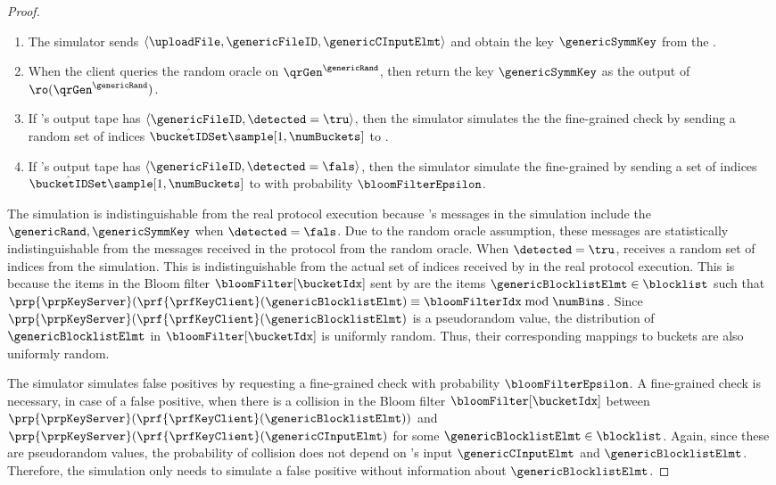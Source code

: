 \begin{proof}
\begin{enumerate}
\item  The simulator sends $\langle \uploadFile, \genericFileID, \genericCInputElmt \rangle$ and obtain the key
$\genericSymmKey$ from the \contentModFunc. 
\item When the client queries the random oracle \ro on $\qrGen^{\genericRand}$, then return the key $\genericSymmKey$ as the output of $\ro(\qrGen^{\genericRand})$. 
\item If \client's output tape has $\langle \genericFileID, \detected = \tru \rangle$, then the simulator simulates the the fine-grained check by sending a random set of indices $\hat{\bucketIDSet} \sample [1, \numBuckets]$ to \client. 
\item If \client's output tape has $\langle \genericFileID, \detected = \fals \rangle$, then the simulator simulate the fine-grained by sending a set of indices $\hat{\bucketIDSet} \sample [1, \numBuckets]$ to \client with probability $\bloomFilterEpsilon$. 
\end{enumerate}



The simulation is indistinguishable from the real protocol execution because \client's messages in the simulation include the $\genericRand,\genericSymmKey$ when $\detected = \fals$. Due to the random oracle assumption, these messages are statistically indistinguishable from the messages received in the protocol from the random oracle. When $\detected = \tru$, \client receives a random set of indices from the simulation. This is indistinguishable from the actual set of indices \bucketIDSet received by \client in the real protocol execution. This is because the items in the Bloom filter $\bloomFilter[\bucketIdx]$ sent by \client are the items $\genericBlocklistElmt \in \blocklist$ such that $\prp{\prpKeyServer}(\prf{\prfKeyClient}(\genericBlocklistElmt) \equiv \bloomFilterIdx \bmod \numBins$. Since $\prp{\prpKeyServer}(\prf{\prfKeyClient}(\genericBlocklistElmt)$ is a pseudorandom value, the distribution of $\genericBlocklistElmt$ in $\bloomFilter[\bucketIdx]$ is uniformly random. Thus, their corresponding mappings to buckets are also uniformly random. 

The simulator simulates false positives by requesting a fine-grained check with probability $\bloomFilterEpsilon$. A fine-grained check is necessary, in case of a false positive, when there is a collision in the Bloom filter $\bloomFilter[\bucketIdx]$ between 
$\prp{\prpKeyServer}(\prf{\prfKeyClient}(\genericBlocklistElmt))$ and $\prp{\prpKeyServer}(\prf{\prfKeyClient}(\genericCInputElmt)$ for some $\genericBlocklistElmt \in \blocklist$.  Again, since these are pseudorandom values, the probability of collision does not depend on \client's input $\genericCInputElmt$ and $\genericBlocklistElmt$. Therefore, the simulation only needs \bloomFilterEpsilon to simulate a false positive without information about $\genericBlocklistElmt$. 
\fi 

\end{proof}
